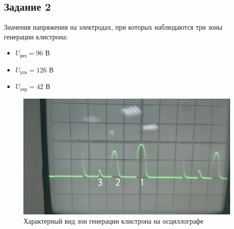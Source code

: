 \subsection{Задание 2}
Значения напряжения на электродах, при которых наблюдаются три зоны генерации клистрона:
\begin{itemize}
	\item $U_{\text{рез}}=96$ В
	\item $U_{\text{уск}}=126$ В
	\item $U_{\text{отр}}=42$ В
\end{itemize}
\begin{figure}[h!]
	\centering
	\includegraphics[width=\linewidth]{img/img1}
	\caption{Характерный вид зон генерации клистрона на осциллографе}
	\label{fig:img1}
\end{figure}
\newpage
